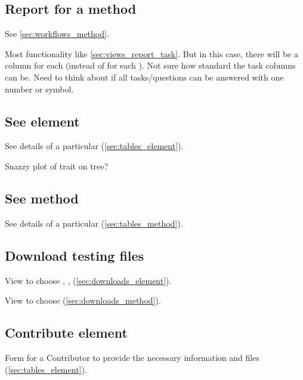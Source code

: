 \subsection{Report for a method}
\label{sec:views_report_method}

See \cref{sec:workflows_method}.

Most functionality like \cref{sec:views_report_task}.
But in this case, there will be a column for each \Task (instead of for each \Method).
Not sure how standard the task columns can be.
Need to think about if all tasks/questions can be answered with one number or symbol.

\subsection{See element}

See details of a particular \Element (\cref{sec:tables_element}).

Snazzy plot of trait on tree?

\subsection{See method}

See details of a particular \Method (\cref{sec:tables_method}).

\subsection{Download testing files}

View to choose \Elements, \Refsets, \Benchmark (\cref{sec:downloads_element}).

View to choose \Methods (\cref{sec:downloads_method}).

\subsection{Contribute element}

Form for a Contributor to provide the necessary information and files (\cref{sec:tables_element}).

